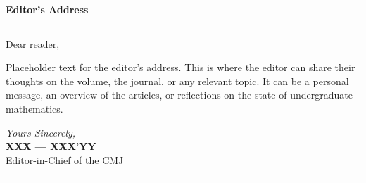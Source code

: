 \clearpage
\thispagestyle{frontmatter}

\vspace*{0.5cm}

\begin{center}
  {\LARGE\bfseries\color{cmjcrimson}Editor's Address}\label{art:address}
\end{center}

\vspace{0.3cm}
\noindent\textcolor{cmjgold}{\rule{\textwidth}{1.2pt}}
\vspace{0.3cm}

\noindent Dear reader,

\vspace{0.25cm}

Placeholder text for the editor's address. This is where the editor can share their 
thoughts on the volume, the journal, or any relevant topic. It can be a personal message, 
an overview of the articles, or reflections on the state of undergraduate mathematics.
\vspace{0.4cm}

\noindent\textit{Yours Sincerely, }\\
\textbf{XXX --- XXX'YY}\\
Editor-in-Chief of the \textcolor{cmjcrimson}{CMJ}
\vspace{0.15cm}

\noindent\textcolor{cmjgold}{\rule{\textwidth}{1.2pt}}

\vspace{0.6cm}